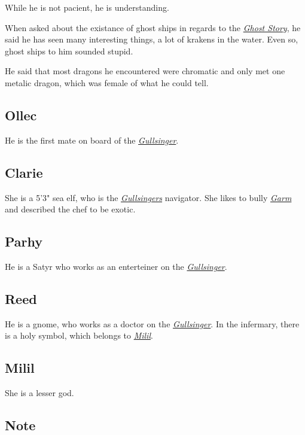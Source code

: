 \documentclass{article}
\begin{document}
\begin{multicols}{2}
    While he is not pacient, he is understanding.

    When asked about the existance of ghost ships in regards to the \hyperref[gohl]{\textit{Ghost Story}}, he said he has seen many interesting things, a lot of krakens in the water. Even so, ghost ships to him sounded
    stupid.

    He said that most dragons he encountered were chromatic and only met one metalic dragon, which was female of what he could tell.

    \subsection{Ollec}
    \label{ollec}

    He is the first mate on board of the \hyperref[gullsinger]{\textit{Gullsinger}}.

    \subsection{Clarie}
    \label{clarie}

    She is a 5'3" sea elf, who is the \hyperref[gullsinger]{\textit{Gullsingers}} navigator. She likes to bully \hyperref[garm]{\textit{Garm}} and described the chef to be exotic.

    \subsection{Parhy}
    \label{parhy}

    He is a Satyr who works as an enterteiner on the \hyperref[gullsinger]{\textit{Gullsinger}}.

    \subsection{Reed}
    \label{reed}

    He is a gnome, who works as a doctor on the \hyperref[gullsinger]{\textit{Gullsinger}}. In the infermary, there is a holy symbol, which belongs to \hyperref[milil]{\textit{Milil}}.

    \subsection{Milil}
    \label{milil}

    She is a lesser god.

    \subsection{Note}
    \label{note}


\end{multicols}
\end{document}
